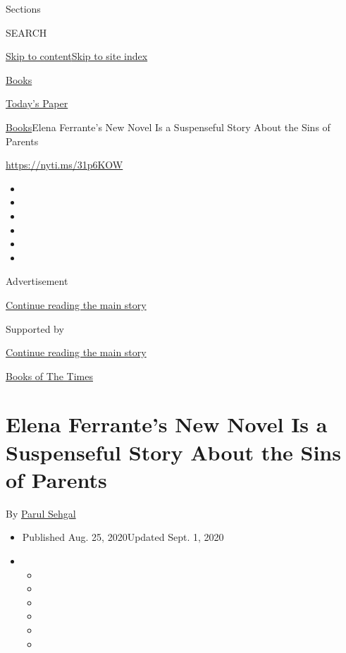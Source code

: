 Sections

SEARCH

\protect\hyperlink{site-content}{Skip to
content}\protect\hyperlink{site-index}{Skip to site index}

\href{https://www.nytimes3xbfgragh.onion/section/books}{Books}

\href{https://myaccount.nytimes3xbfgragh.onion/auth/login?response_type=cookie\&client_id=vi}{}

\href{https://www.nytimes3xbfgragh.onion/section/todayspaper}{Today's
Paper}

\href{/section/books}{Books}\textbar{}Elena Ferrante's New Novel Is a
Suspenseful Story About the Sins of Parents

\url{https://nyti.ms/31p6KOW}

\begin{itemize}
\item
\item
\item
\item
\item
\item
\end{itemize}

Advertisement

\protect\hyperlink{after-top}{Continue reading the main story}

Supported by

\protect\hyperlink{after-sponsor}{Continue reading the main story}

\href{/column/books-of-the-times}{Books of The Times}

\hypertarget{elena-ferrantes-new-novel-is-a-suspenseful-story-about-the-sins-of-parents}{%
\section{Elena Ferrante's New Novel Is a Suspenseful Story About the
Sins of
Parents}\label{elena-ferrantes-new-novel-is-a-suspenseful-story-about-the-sins-of-parents}}

By \href{https://www.nytimes3xbfgragh.onion/by/parul-sehgal}{Parul
Sehgal}

\begin{itemize}
\item
  Published Aug. 25, 2020Updated Sept. 1, 2020
\item
  \begin{itemize}
  \item
  \item
  \item
  \item
  \item
  \item
  \end{itemize}
\end{itemize}

